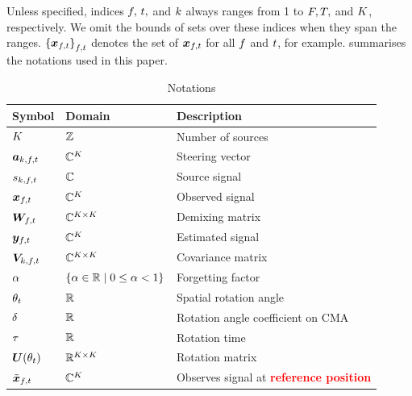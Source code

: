 \documentclass[sip,biber]{now-journal}
\begin{document}
Unless specified, indices $f,\, t,$ and $k$ always ranges from 1 to $F, T,$ and $K$, respectively.
We omit the bounds of sets over these indices when they span the ranges.
${\{\Obs _{\ft}\}}_{\ft}$ denotes the set of $\Obs _{\ft}$ for all $f$ and $t$, for example.
 summarises the notations used in this paper.
\begin{table}[t]
  \centering
  \caption{Notations}\label{tab:notations}
  \begin{tabular}{lll}
    \toprule
      Symbol & Domain & Description \\
    \midrule
      $K$                               & $\mathbb{Z}$                     & Number of sources \\
      $\steer _{\src,\ft}$                 & $\mathbb{C} ^{K}$             & Steering vector \\
      $\sig _{\src,\ft}$                   & $\mathbb{C}$                     & Source signal \\
      $\Obs _{\ft}$                        & $\mathbb{C}^{K}$              & Observed signal \\
      $\Demix _{\ft}$                      & $\mathbb{C}^{K \times K}$  & Demixing matrix \\
      $\Est _{\ft}$                        & $\mathbb{C}^{K}$              & Estimated signal \\
      $\cov _{\src,\ft}$                   & $\mathbb{C}^{K \times K}$  & Covariance matrix \\
      $\alpha$                            & $\{\alpha \in \mathbb{R} \mid 0 \leq \alpha < 1\}$   & Forgetting factor \\
      $\theta _{t}$                & $\mathbb{R}$                     & Spatial rotation angle \\
      $\delta$                           & $\mathbb{R}$                     & Rotation angle coefficient on CMA \\
      $\tau$                            & $\mathbb{R}$                     & Rotation time \\
      $\bm{U} (\theta _{t})$      & $\mathbb{R} ^{K \times K}$ & Rotation matrix \\
      $\refpos{\Obs} _{\ft}$ & $\mathbb{C}^{K}$ & Observes signal at \textcolor{red}{\textbf{reference position}} \\
    \bottomrule
  \end{tabular}
\end{table}
\end{document}
